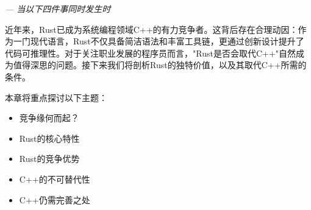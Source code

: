 
\begin{flushright}
\textit{--- 当以下四件事同时发生时}
\end{flushright}

近年来，Rust已成为系统编程领域C++的有力竞争者。这背后存在合理动因：作为一门现代语言，Rust不仅具备简洁语法和丰富工具链，更通过创新设计提升了代码可推理性。对于关注职业发展的程序员而言，"Rust是否会取代C++"自然成为值得深思的问题。接下来我们将剖析Rust的独特价值，以及其取代C++所需的条件。

本章将重点探讨以下主题：

\begin{itemize}
\item 
竞争缘何而起？

\item 
Rust的核心特性

\item 
Rust的竞争优势

\item 
C++的不可替代性

\item 
C++仍需完善之处
\end{itemize}